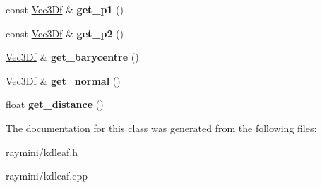 \begin{DoxyCompactItemize}
\item 
\hypertarget{classkdleaf_a96acefe5b601f195bd9def7481a73693}{
const \hyperlink{class_vec3_d}{Vec3Df} \& {\bfseries get\_\-p1} ()}
\label{classkdleaf_a96acefe5b601f195bd9def7481a73693}

\item 
\hypertarget{classkdleaf_ab1bae043e7f280a7df9fc181c400d894}{
const \hyperlink{class_vec3_d}{Vec3Df} \& {\bfseries get\_\-p2} ()}
\label{classkdleaf_ab1bae043e7f280a7df9fc181c400d894}

\item 
\hypertarget{classkdleaf_ac666a00919ebe62e28a07859958e819e}{
\hyperlink{class_vec3_d}{Vec3Df} \& {\bfseries get\_\-barycentre} ()}
\label{classkdleaf_ac666a00919ebe62e28a07859958e819e}

\item 
\hypertarget{classkdleaf_aad846bf2b18442b770dc4be9291402c9}{
\hyperlink{class_vec3_d}{Vec3Df} \& {\bfseries get\_\-normal} ()}
\label{classkdleaf_aad846bf2b18442b770dc4be9291402c9}

\item 
\hypertarget{classkdleaf_aa47457a9b7916bd6bcae50b4b77722c4}{
float {\bfseries get\_\-distance} ()}
\label{classkdleaf_aa47457a9b7916bd6bcae50b4b77722c4}

\end{DoxyCompactItemize}


The documentation for this class was generated from the following files:\begin{DoxyCompactItemize}
\item 
raymini/kdleaf.h\item 
raymini/kdleaf.cpp\end{DoxyCompactItemize}
